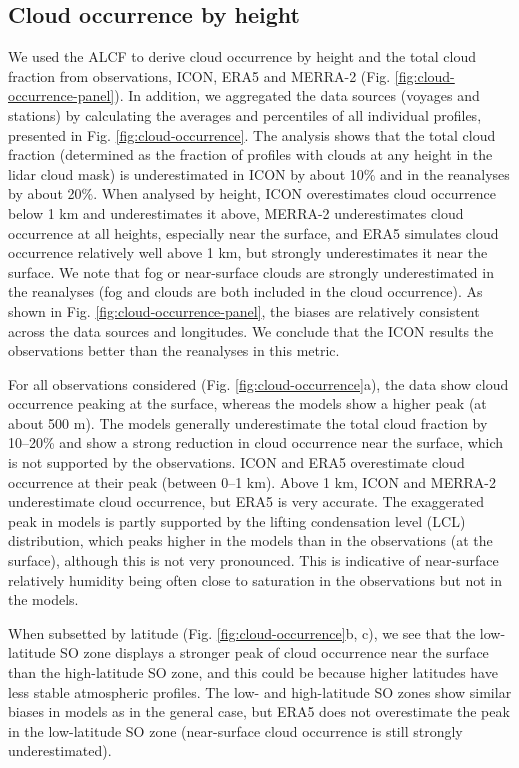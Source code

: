 \documentclass[12pt,a4paper]{article}
\begin{document}
\subsection{Cloud occurrence by height}
\label{sec:cloud-occurrence}

We used the ALCF to derive cloud occurrence by height and the total cloud
fraction from observations, ICON, ERA5 and MERRA-2 (Fig.
\ref{fig:cloud-occurrence-panel}). In addition, we aggregated the data sources
(voyages and stations) by calculating the averages and percentiles of all
individual profiles, presented in Fig. \ref{fig:cloud-occurrence}. The analysis
shows that the total cloud fraction (determined as the fraction of profiles
with clouds at any height in the lidar cloud mask) is underestimated in ICON by
about 10\% and in the reanalyses by about 20\%. When analysed by height, ICON
overestimates cloud occurrence below 1 km and underestimates it above, MERRA-2
underestimates cloud occurrence at all heights, especially near the surface,
and ERA5 simulates cloud occurrence relatively well above 1 km, but strongly
underestimates it near the surface.  We note that fog or near-surface clouds
are strongly underestimated in the reanalyses (fog and clouds are both included
in the cloud occurrence).  As shown in Fig.  \ref{fig:cloud-occurrence-panel},
the biases are relatively consistent across the data sources and longitudes. We
conclude that the ICON results  the observations better than the reanalyses in
this metric.

For all observations considered (Fig. \ref{fig:cloud-occurrence}a), the data
show cloud occurrence peaking at the surface, whereas the models show a higher
peak (at about 500 m). The models generally underestimate the total cloud
fraction by 10--20\% and show a strong reduction in cloud occurrence near the
surface, which is not supported by the observations. ICON and ERA5 overestimate
cloud occurrence at their peak (between 0--1 km). Above 1 km, ICON and MERRA-2
underestimate cloud occurrence, but ERA5 is very accurate. The exaggerated peak
in models is partly supported by the lifting condensation level (LCL)
distribution, which peaks higher in the models than in the observations (at the
surface), although this is not very pronounced. This is indicative of
near-surface relatively humidity being often close to saturation in the
observations but not in the models.

When subsetted by latitude (Fig.  \ref{fig:cloud-occurrence}b, c), we see that
the low-latitude SO zone displays a stronger peak of cloud occurrence near the
surface than the high-latitude SO zone, and this could be because higher
latitudes have less stable atmospheric profiles. The low- and high-latitude SO
zones show similar biases in models as in the general case, but ERA5 does not
overestimate the peak in the low-latitude SO zone (near-surface cloud
occurrence is still strongly underestimated).
\end{document}
